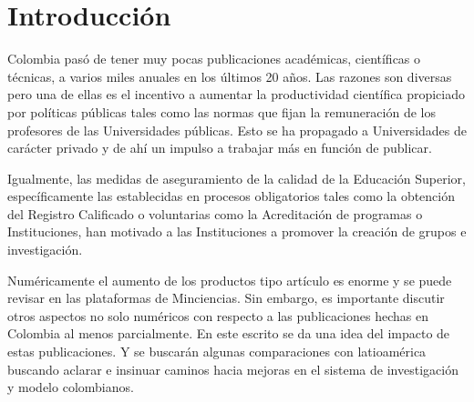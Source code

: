 \documentclass[
11pt, %
letter, %
oneside, %
]{article} %
\begin{document}


\let\thefootnote\relax{}




\newpage %


\section{Introducción}

Colombia pasó de tener muy pocas publicaciones académicas, científicas o técnicas, a varios miles anuales en los últimos 20 años. Las razones son diversas pero una de ellas es el incentivo a aumentar la productividad científica propiciado por políticas públicas tales como las normas que fijan la remuneración de los profesores de las Universidades públicas. Esto se ha propagado a Universidades de carácter privado y de ahí un impulso a trabajar más en función de publicar. 

Igualmente, las medidas de aseguramiento de la calidad de la Educación Superior, específicamente las establecidas en procesos obligatorios tales como la obtención del Registro Calificado o voluntarias como la Acreditación de programas o Instituciones, han motivado a las Instituciones a promover la creación de grupos e investigación.

Numéricamente el aumento de los productos tipo artículo es enorme y se puede revisar en las plataformas de Minciencias. Sin embargo, es importante discutir otros aspectos no solo numéricos con respecto a las publicaciones hechas en Colombia al menos parcialmente. En este escrito se da una idea del impacto de estas publicaciones. Y se buscarán algunas comparaciones con latioamérica buscando aclarar e insinuar caminos hacia mejoras en el sistema de investigación y modelo colombianos. 
\end{document}
